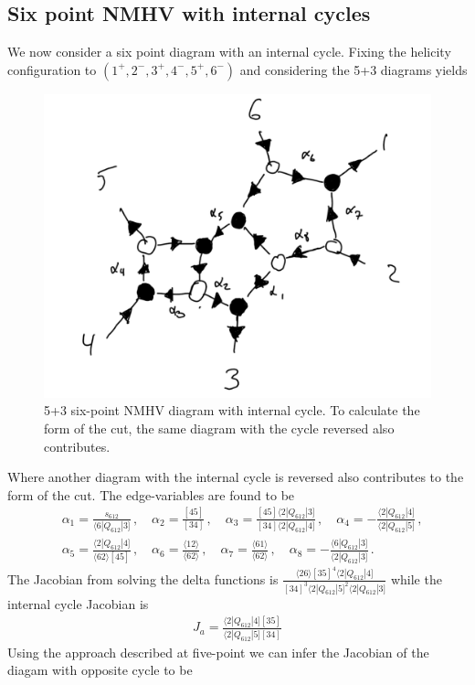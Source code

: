 \documentclass[letter,11pt]{article}
\newcommand{\ab}[1]{\langle #1 \rangle}
\newcommand{\sqb}[1]{[ #1 ]}
\newcommand{\aMs}[3]{\langle #1|#2|#3]}  		%
\newcommand{\sab}[1]{s_{#1}}
\begin{document}
\subsection{Six point NMHV with internal cycles}
We now consider a six point diagram with an internal cycle. Fixing the helicity configuration to $(1^+,2^-,3^+,4^-,5^+,6^-)$ and considering the 5+3 diagrams yields 
\begin{figure}[H]
	\centering
	\includegraphics[width=0.4\linewidth]{3+5L}
	\caption{5+3 six-point NMHV diagram with internal cycle. To calculate the form of the cut, the same diagram with the cycle reversed also contributes.}
	\label{fig:5pt3l}
\end{figure}\noindent 
Where another diagram with the internal cycle is reversed also contributes to the form of the cut. The edge-variables are found to be
\begin{equation}
	\begin{aligned}
		& \alpha_1 = \frac{\sab{612}}{\aMs{6}{Q_{612}}{3}}\,, \quad \alpha_2 = \frac{[45]}{[34]}\,, \quad \alpha_3 = \frac{[45]\aMs{2}{Q_{612}}{3}}{[34]\aMs{2}{Q_{612}}{4}}\,, \quad \alpha_4 = -\frac{\aMs{2}{Q_{612}}{4}}{\aMs{2}{Q_{612}}{5}}\,,\\ 
		&\alpha_5 = \frac{\aMs{2}{Q_{612}}{4}}{\ab{62}[45]}\,, 
		\quad
		\alpha_6 = \frac{\ab{12}}{\ab{62}}\,,\quad \alpha_7 = \frac{\ab{61}}{\ab{62}}\,,\quad
		\alpha_8 = - \frac{\aMs{6}{Q_{612}}{3}}{\aMs{2}{Q_{612}}{3}}\,.
	\end{aligned}
\end{equation}
The Jacobian from solving the delta functions is $ \frac{\ab{26}\sqb{35}^4\aMs{2}{Q_{612}}{4}}{\sqb{34}^3\aMs{2}{Q_{612}}{5}^2\aMs{2}{Q_{612}}{3}}$ while the internal cycle Jacobian is
\begin{equation}
	\begin{aligned}
		J_a=\frac{\aMs{2}{Q_{612}}{4}\sqb{35}}{\aMs{2}{Q_{612}}{5}\sqb{34}}
	\end{aligned}
\end{equation}
Using the approach described at five-point we can infer the Jacobian of the diagam with opposite cycle to be
\end{document}
